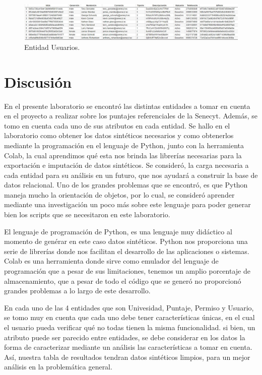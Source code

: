 \documentclass[10pt, oneside,spanish]{article}   	%
\begin{document}
\begin{figure}[H] 
        \centering \includegraphics[width=1\columnwidth]{TablaUsuarios.jpg}
        \caption{\label{fig4}Entidad Usuarios.
        }
\end{figure}

\section{Discusión}
En el presente laboratorio se encontró las distintas entidades a tomar en cuenta en el proyecto a realizar sobre los puntajes referenciales de la Senecyt. Además, se tomo en cuenta cada uno de sus atributos en cada entidad. Se hallo en el laboratorio como obtener los datos sintéticos necesarios y como obtenerlos mediante la programación en el lenguaje de Python, junto con la herramienta Colab, la cual aprendimos qué esta nos brinda las librerías necesarias para la exportación e imputación de datos sintéticos. Se consideró, la carga necesaria a cada entidad para su análisis en un futuro, que nos ayudará a construir la base de datos relacional. Uno de los grandes problemas que se encontró, es que Python maneja mucho la orientación de objetos, por lo cual, se consideró aprender mediante una investigación un poco más sobre este lenguaje para poder generar bien los scripts que se necesitaron en este laboratorio. 

El lenguaje de programación de Python, es una lenguaje muy didáctico al momento de genérar en este caso datos sintéticos. Python nos proporciona una serie de librerías donde nos facilitan el desarrollo de las aplicaciones o sistemas. Colab es una herramienta donde sirve como emulador del lenguaje de programación que a pesar de sus limitaciones, tenemos un amplio porcentaje de almacenamiento, que a pesar de todo el código que se generó no proporcionó grandes problemas a lo largo de este desarrollo.

En cada uno de las 4 entidades que son Univesidad, Puntaje, Permiso y Usuario, se tomo muy en cuenta que cada uno debe tener características únicas, en el cual el usuario pueda verificar qué no todas tienen la misma funcionalidad. si bien, un atributo puede ser parecido entre entidades, se debe considerar en los datos la forma de caracterizar mediante un análisis las características a tomar en cuenta. Así, nuestra tabla de resultados tendran datos sintéticos limpios, para un mejor análisis en la problemática general. 
\end{document}
